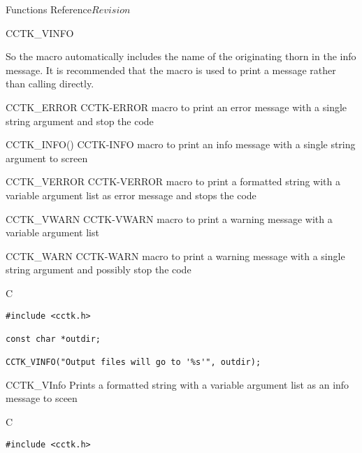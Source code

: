 \begin{cactuspart}{ Functions Reference}{}{$Revision$}
\begin{FunctionDescription}{CCTK\_VINFO}
\begin{Discussion}
So the macro automatically includes the name of the originating thorn in the
info message. It is recommended that the macro  is used
to print a message rather than calling  directly.
\end{Discussion}

\begin{SeeAlsoSection}
\begin{SeeAlso2} {CCTK\_ERROR} {CCTK-ERROR}
macro to print an error message with a single string argument and stop
the code
\begin{SeeAlso2} {CCTK\_INFO()} {CCTK-INFO}
macro to print an info message with a single string argument to screen
\end{SeeAlso2}
\end{SeeAlso2}
\begin{SeeAlso2} {CCTK\_VERROR} {CCTK-VERROR}
macro to print a formatted string with a variable argument list as error
message and stops the code
\end{SeeAlso2}
\begin{SeeAlso2} {CCTK\_VWARN} {CCTK-VWARN}
macro to print a warning message with a variable argument list
\end{SeeAlso2}
\begin{SeeAlso2} {CCTK\_WARN} {CCTK-WARN}
macro to print a warning message with a single string argument and
possibly stop the code
\end{SeeAlso2}
\end{SeeAlsoSection}

\begin{ExampleSection}
\begin{Example}{C}
\begin{verbatim}
#include <cctk.h>

const char *outdir;

CCTK_VINFO("Output files will go to '%s'", outdir);
\end{verbatim}
\end{Example}
\end{ExampleSection}
\end{FunctionDescription}


\begin{FunctionDescription}{CCTK\_VInfo}
\label{CCTK-VInfo}
Prints a formatted string with a variable argument list as an info message
to sceen

\begin{SynopsisSection}
\begin{Synopsis}{C}
\begin{verbatim}
#include <cctk.h>


\end{verbatim}
\end{Synopsis}
\end{SynopsisSection}
\end{FunctionDescription}
\end{cactuspart}
